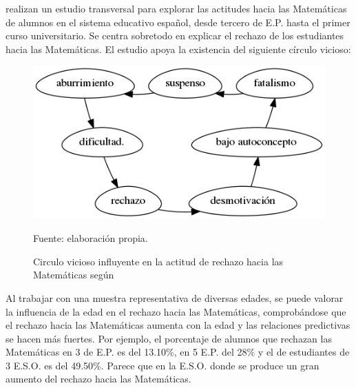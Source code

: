 \label{sec:estudioNacional}
%
\citet*{ActitudesHaciaMates} realizan un estudio transversal para explorar las actitudes hacia las Matemáticas de alumnos en el sistema educativo español, desde tercero de E.P. hasta el primer curso universitario. 
%
Se centra sobretodo en explicar el rechazo de los estudiantes hacia las Matemáticas.
%
El estudio apoya la existencia del siguiente círculo vicioso: 



\begin{figure}[hbt]
\centering
\caption{Circulo vicioso influyente en la actitud de rechazo hacia las Matemáticas según \citep{ActitudesHaciaMates}}
\label{fig::circuloVicioso}
\includegraphics[scale=0.57]{img/circuloVicioso.png}

\small{Fuente: elaboración propia.}
\end{figure}
\FloatBarrier




Al trabajar con una muestra representativa de diversas edades, se puede valorar la influencia de la edad en el rechazo hacia las Matemáticas, comprobándose que el rechazo hacia las Matemáticas aumenta con la edad y las relaciones predictivas se hacen más fuertes.
%
Por ejemplo, el porcentaje de alumnos que rechazan las Matemáticas en 3 de E.P. es del 13.10\%, en 5 E.P. del 28\%  y el de estudiantes de 3 E.S.O. es del 49.50\%.
%
Parece que en la E.S.O. donde se produce un gran aumento del rechazo hacia las Matemáticas.


